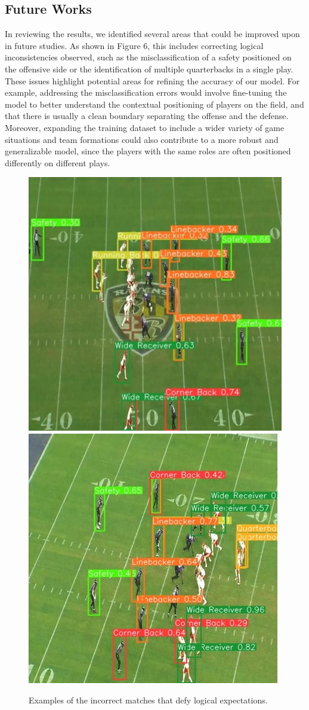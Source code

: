 \subsection{Future Works}
In reviewing the results, we identified several areas that could be improved upon in future studies. As shown in Figure 6, this includes correcting logical inconsistencies observed, such as the misclassification of a safety positioned on the offensive side or the identification of multiple quarterbacks in a single play. These issues highlight potential areas for refining the accuracy of our model. For example, addressing the misclassification errors would involve fine-tuning the model to better understand the contextual positioning of players on the field, and that there is usually a clean boundary separating the offense and the defense. Moreover, expanding the training dataset to include a wider variety of game situations and team formations could also contribute to a more robust and generalizable model, since the players with the same roles are often positioned differently on different plays.

\begin{figure}[t]
    \centering
    \includegraphics[width=0.4\linewidth]{mismatch_1.jpg}
    \includegraphics[width=0.4\linewidth]{mismatch_2.jpg}
    \caption{Examples of the incorrect matches that defy logical expectations.}
    \label{fig:result2}
\end{figure}

